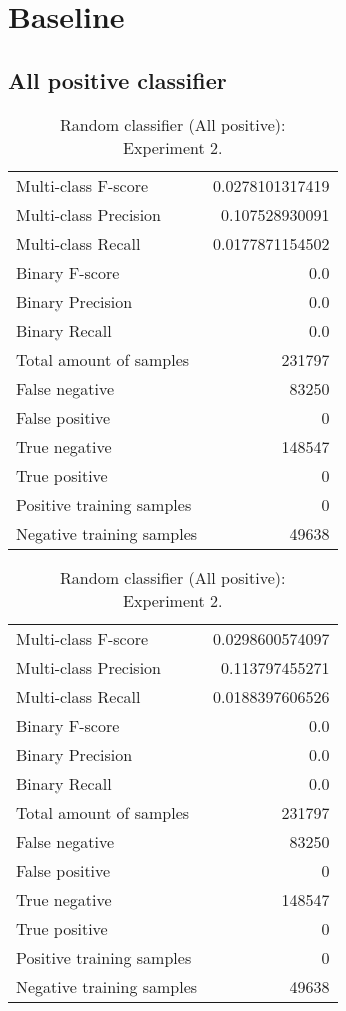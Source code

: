 
\chapter{Baseline} %

\section{All positive classifier}

\begin{table}[H]
\begin{minipage}{0.5\textwidth}
\caption{Random classifier (All positive): \\Experiment 1.}
\centering
\begin{tabular}{l r}
\toprule
Multi-class F-score & 0.0278101317419 \\
Multi-class Precision & 0.107528930091 \\
Multi-class Recall & 0.0177871154502 \\
\midrule
Binary F-score & 0.0 \\
Binary Precision & 0.0 \\
Binary Recall & 0.0 \\
\midrule
Total amount of samples & 231797 \\
False negative & 83250 \\
False positive & 0 \\
True negative & 148547 \\
True positive & 0 \\
\midrule
Positive training samples & 0 \\
Negative training samples & 49638 \\
\bottomrule
\end{tabular}
\end{minipage}
\hfillx
\begin{minipage}{0.5\textwidth}
\caption{Random classifier (All positive): \\Experiment 2.}
\centering
\begin{tabular}{l r}
\toprule
Multi-class F-score & 0.0298600574097 \\
Multi-class Precision & 0.113797455271 \\
Multi-class Recall & 0.0188397606526 \\
\midrule
Binary F-score & 0.0 \\
Binary Precision & 0.0 \\
Binary Recall & 0.0 \\
\midrule
Total amount of samples & 231797 \\
False negative & 83250 \\
False positive & 0 \\
True negative & 148547 \\
True positive & 0 \\
\midrule
Positive training samples & 0 \\
Negative training samples & 49638 \\
\bottomrule
\end{tabular}
\end{minipage}
\end{table}
